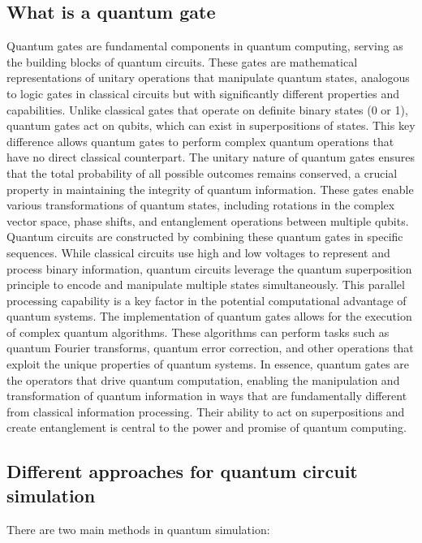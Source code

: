 \documentclass[12pt,oneside,a4paper]{article}
\begin{document}
\subsection{What is a quantum gate}
Quantum gates are fundamental components in quantum computing, serving as the building blocks of quantum circuits. These gates are mathematical representations of unitary operations that manipulate quantum states, analogous to logic gates in classical circuits but with significantly different properties and capabilities.
Unlike classical gates that operate on definite binary states (0 or 1), quantum gates act on qubits, which can exist in superpositions of states. This key difference allows quantum gates to perform complex quantum operations that have no direct classical counterpart.
The unitary nature of quantum gates ensures that the total probability of all possible outcomes remains conserved, a crucial property in maintaining the integrity of quantum information. These gates enable various transformations of quantum states, including rotations in the complex vector space, phase shifts, and entanglement operations between multiple qubits.
Quantum circuits are constructed by combining these quantum gates in specific sequences. While classical circuits use high and low voltages to represent and process binary information, quantum circuits leverage the quantum superposition principle to encode and manipulate multiple states simultaneously. This parallel processing capability is a key factor in the potential computational advantage of quantum systems.
The implementation of quantum gates allows for the execution of complex quantum algorithms. These algorithms can perform tasks such as quantum Fourier transforms, quantum error correction, and other operations that exploit the unique properties of quantum systems.
In essence, quantum gates are the operators that drive quantum computation, enabling the manipulation and transformation of quantum information in ways that are fundamentally different from classical information processing. Their ability to act on superpositions and create entanglement is central to the power and promise of quantum computing.

\subsection{Different approaches for quantum circuit simulation}
There are two main methods in quantum simulation: \\
\end{document}
